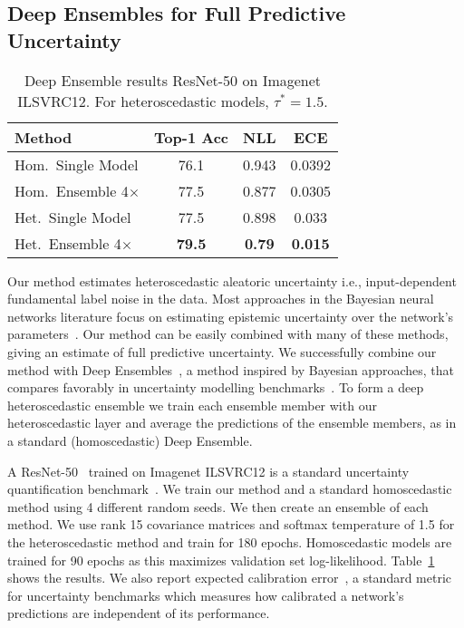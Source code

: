 \documentclass[final]{cvpr}
\begin{document}
\subsection{Deep Ensembles for Full Predictive Uncertainty}
\label{sec:deep_ensembles}

\begin{table}[tbh]
\centering
\begin{tabular}{lccc}
\toprule
Method & Top-1 Acc & NLL & ECE \\
\midrule
Hom.\ Single Model & 76.1 & 0.943 & 0.0392 \\
Hom.\ Ensemble 4$\times$ & 77.5 & 0.877 & 0.0305\\ 
\midrule
Het.\ Single Model  & 77.5 & 0.898 & 0.033\\ 
Het.\ Ensemble 4$\times$ & \textbf{79.5} & \textbf{0.79} & \textbf{0.015}\\ 
\bottomrule
\end{tabular}
\caption{Deep Ensemble results ResNet-50 on Imagenet ILSVRC12. For heteroscedastic models, $\tau^\ast = 1.5$.}
\label{table:deep_ensembles}
\end{table}

Our method estimates heteroscedastic aleatoric uncertainty i.e., input-dependent fundamental label noise in the data. Most approaches in the Bayesian neural networks literature focus on estimating epistemic uncertainty over the network's parameters~\cite{gal2016dropout,gal2017concrete,blundell2015weight, neal1995bayesian, wilson2020bayesian, wenzel2020good,lakshminarayanan2017simple}. Our method can be easily combined with many of these methods, giving an estimate of full predictive uncertainty. We successfully combine our method with Deep Ensembles~\cite{lakshminarayanan2017simple}, a method inspired by Bayesian approaches, that compares favorably in uncertainty modelling benchmarks~\cite{snoek2019can, gustafsson2019evaluating}. To form a deep heteroscedastic ensemble we train each ensemble member with our heteroscedastic layer and average the predictions of the ensemble members, as in a standard (homoscedastic) Deep Ensemble.

A ResNet-50~\cite{he2016deep} trained on Imagenet ILSVRC12 is a standard uncertainty quantification benchmark~\cite{dusenberry2020efficient,wen2020combining}. We train our method and a standard homoscedastic method using 4 different random seeds. We then create an ensemble of each method. We use rank 15 covariance matrices and softmax temperature of 1.5 for the heteroscedastic method and train for 180 epochs. Homoscedastic models are trained for 90 epochs as this maximizes validation set log-likelihood. Table~\ref{table:deep_ensembles} shows the results. We also report expected calibration error~\cite{guo2017calibration}, a standard metric for uncertainty benchmarks which measures how calibrated a network's predictions are independent of its performance.
\end{document}
